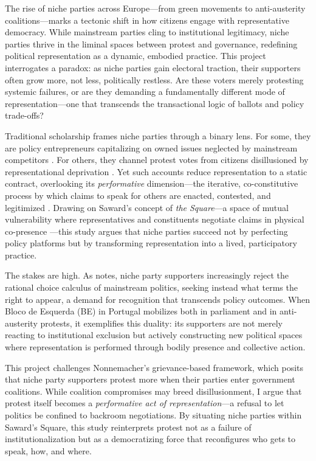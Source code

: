 \begin{greenenv}
	The rise of niche parties across Europe—from green movements to anti-austerity coalitions—marks a tectonic shift in how citizens engage with representative democracy. While mainstream parties cling to institutional legitimacy, niche parties thrive in the liminal spaces between protest and governance, redefining political representation as a dynamic, embodied practice. This project interrogates a paradox: as niche parties gain electoral traction, their supporters often grow more, not less, politically restless. Are these voters merely protesting systemic failures, or are they demanding a fundamentally different mode of representation—one that transcends the transactional logic of ballots and policy trade-offs?

	Traditional scholarship frames niche parties through a binary lens. For some, they are policy entrepreneurs capitalizing on owned issues neglected by mainstream competitors \parencite{meguid2005}. For others, they channel protest votes from citizens disillusioned by representational deprivation \parencite{nonnemacher2023}. Yet such accounts reduce representation to a static contract, overlooking its \textit{performative} dimension—the iterative, co-constitutive process by which claims to speak for others are enacted, contested, and legitimized \parencite{saward2010}. Drawing on Saward’s concept of \textit{the Square}—a space of mutual vulnerability where representatives and constituents negotiate claims in physical co-presence \parencite[5]{saward2024}—this study argues that niche parties succeed not by perfecting policy platforms but by transforming representation into a lived, participatory practice.

	The stakes are high. As \textcite{stiers2024} notes, niche party supporters increasingly reject the rational choice calculus of mainstream politics, seeking instead what \cite{kim2024} terms the right to appear, a demand for recognition that transcends policy outcomes. When Bloco de Esquerda (BE) in Portugal mobilizes both in parliament and in anti-austerity protests, it exemplifies this duality: its supporters are not merely reacting to institutional exclusion but actively constructing new political spaces where representation is performed through bodily presence and collective action.

	This project challenges Nonnemacher’s \parencite*{nonnemacher2023} grievance-based framework, which posits that niche party supporters protest more when their parties enter government coalitions. While coalition compromises may breed disillusionment, I argue that protest itself becomes a \textit{performative act of representation}—a refusal to let politics be confined to backroom negotiations. By situating niche parties within Saward’s Square, this study reinterprets protest not as a failure of institutionalization but as a democratizing force that reconfigures who gets to speak, how, and where.


\end{greenenv}
